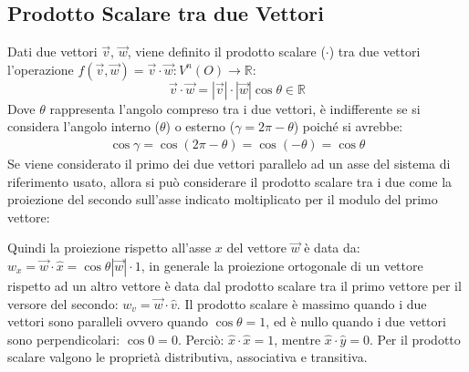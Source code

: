 \documentclass{article}
\numberwithin{equation}{subsection}
\begin{document}
\subsection{Prodotto Scalare tra due Vettori}
Dati due vettori $\vec{v}$, $\vec{w}$, viene definito il prodotto scalare ($\cdot$) tra due vettori l'operazione $f(\vec{v},\vec{w})=\vec{v}\cdot\vec{w}:V^{n}(O)\to\mathbb{R}$: 
\begin{equation}
    \vec{v}\cdot\vec{w} =  |\vec{v}|\cdot|\vec{w}| \cos\theta\in \mathbb{R}
\end{equation}
Dove $\theta$ rappresenta l'angolo compreso tra i due vettori, è indifferente se si considera l'angolo interno ($\theta$) o esterno ($\gamma = 2\pi - \theta$) poiché si avrebbe:
\begin{gather*}
    \cos\gamma = \cos(2\pi - \theta) = \cos(-\theta) = \cos\theta
\end{gather*}
Se viene considerato il primo dei due vettori parallelo ad un asse del sistema di riferimento usato, allora si può considerare
il prodotto scalare tra i due come la proiezione del secondo sull'asse indicato moltiplicato per il modulo del primo vettore:

\begin{center}\end{center}

Quindi la proiezione rispetto all'asse $x$ del vettore 
$\vec{w}$ è data da: $w_x = \vec{w}\cdot\hat{x}= 
\cos\theta|\vec{w}|\cdot1$, in generale la proiezione 
ortogonale di un vettore rispetto ad un altro vettore è 
data dal prodotto scalare tra il primo vettore per il versore 
del secondo: $w_v = \vec{w}\cdot\hat{v}$.
Il prodotto scalare è massimo quando i due vettori sono 
paralleli ovvero quando $\cos\theta = 1$, ed è nullo
quando i due vettori sono perpendicolari: $\cos0 = 0$.
Perciò: $\hat{x}\cdot\hat{x} = 1$, mentre $\hat{x}\cdot\hat{y} = 0$. 
Per il prodotto scalare valgono le proprietà distributiva, associativa e
transitiva. 
\end{document}
